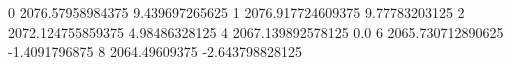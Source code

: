 0 2076.57958984375 9.439697265625
1 2076.917724609375 9.77783203125
2 2072.124755859375 4.98486328125
4 2067.139892578125 0.0
6 2065.730712890625 -1.4091796875
8 2064.49609375 -2.643798828125
